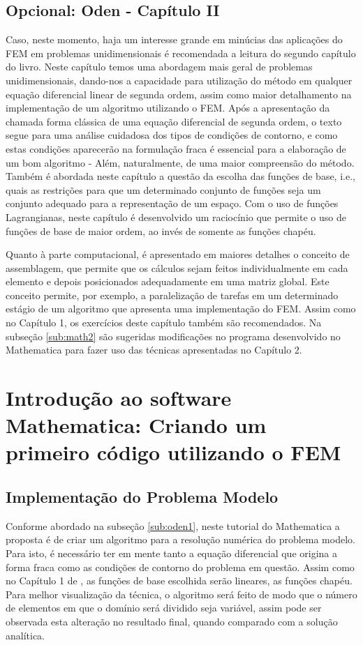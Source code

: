 \documentclass[11pt, oneside]{article}   	%
\begin{document}
\subsection{Opcional: Oden - Capítulo II}
\label{sub:oden2}
Caso, neste momento, haja um interesse grande em minúcias das aplicações do FEM em problemas unidimensionais é recomendada a leitura do segundo capítulo do livro. Neste capítulo temos uma abordagem mais geral de problemas unidimensionais, dando-nos a capacidade para utilização do método em qualquer equação diferencial linear de segunda ordem, assim como maior detalhamento na implementação de um algoritmo utilizando o FEM. Após a apresentação da chamada forma clássica de uma equação diferencial de segunda ordem, o texto segue para uma análise cuidadosa dos tipos de condições de contorno, e como estas condições aparecerão na formulação fraca é essencial para a elaboração de um bom algoritmo - Além, naturalmente, de uma maior compreensão do método. Também é abordada neste capítulo a questão da escolha das funções de base, i.e., quais as restrições para que um determinado conjunto de funções seja um conjunto adequado para a representação de um espaço. Com o uso de funções Lagrangianas, neste capítulo é desenvolvido um raciocínio que permite o uso de funções de base de maior ordem, ao invés de somente as funções chapéu.

Quanto à parte computacional, é apresentado em maiores detalhes o conceito de assemblagem, que permite que os cálculos sejam feitos individualmente em cada elemento e depois posicionados adequadamente em uma matriz global. Este conceito permite, por exemplo, a paralelização de tarefas em um determinado estágio de um algoritmo que apresenta uma implementação do FEM. Assim como no Capítulo 1, os exercícios deste capítulo também são recomendados. Na subseção \ref{sub:math2} são sugeridas modificações no programa desenvolvido no Mathematica para fazer uso das técnicas apresentadas no Capítulo 2.
\newpage

\section{Introdução ao software Mathematica: Criando um primeiro código utilizando o FEM}
\label{sec:math}
\subsection*{Implementação do Problema Modelo}
Conforme abordado na subseção \ref{sub:oden1}, neste tutorial do Mathematica a proposta é de criar um algoritmo para a resolução numérica do problema modelo. Para isto, é necessário ter em mente tanto a equação diferencial que origina a forma fraca como as condições de contorno do problema em questão. Assim como no Capítulo 1 de \citet{oden81}, as funções de base escolhida serão lineares, as funções chapéu. Para melhor visualização da técnica, o algoritmo será feito de modo que o número de elementos em que o domínio será dividido seja variável, assim pode ser observada esta alteração no resultado final, quando comparado com a solução analítica.
\end{document}
